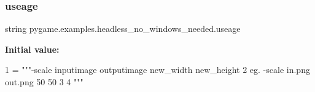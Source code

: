 \subsubsection{\texorpdfstring{useage}{useage}}
{\footnotesize\ttfamily string pygame.\+examples.\+headless\+\_\+no\+\_\+windows\+\_\+needed.\+useage}

{\bfseries Initial value\+:}
\begin{DoxyCode}
1 =  \textcolor{stringliteral}{"""-scale inputimage outputimage new\_width new\_height}
2 \textcolor{stringliteral}{eg.  -scale in.png out.png 50 50}
3 \textcolor{stringliteral}{}
4 \textcolor{stringliteral}{"""}
\end{DoxyCode}
